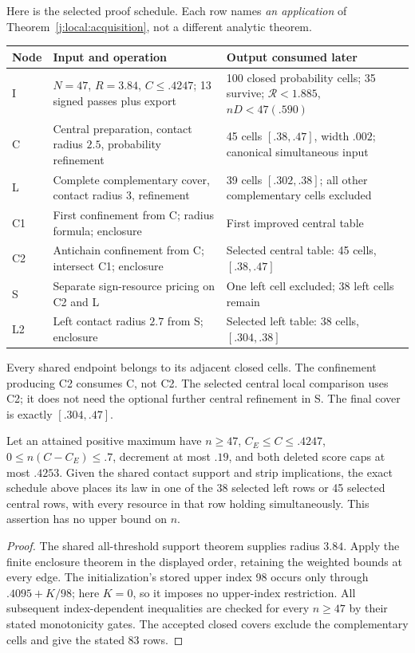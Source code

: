 Here is the selected proof schedule. Each row names \emph{an application}
of Theorem~\ref{j:local:acquisition}, not a different analytic theorem.
\begin{center}\small
\begin{tabular}{p{.13\linewidth}p{.32\linewidth}p{.45\linewidth}}
\toprule
Node&Input and operation&Output consumed later\\\midrule
I&$N=47$, $R=3.84$, $C\le.4247$; 13 signed passes plus export&
100 closed probability cells; 35 survive; $\mathcal R<1.885$, $nD<47(.590)$\\
C&Central preparation, contact radius $2.5$, probability refinement&
45 cells $[.38,.47]$, width $.002$; canonical simultaneous input\\
L&Complete complementary cover, contact radius $3$, refinement&
39 cells $[.302,.38]$; all other complementary cells excluded\\
C1&First confinement from C; radius formula; enclosure&
First improved central table\\
C2&Antichain confinement from C; intersect C1; enclosure&
Selected central table: 45 cells, $[.38,.47]$\\
S&Separate sign-resource pricing on C2 and L&
One left cell excluded; 38 left cells remain\\
L2&Left contact radius $2.7$ from S; enclosure&
Selected left table: 38 cells, $[.304,.38]$\\\bottomrule
\end{tabular}
\end{center}
Every shared endpoint belongs to its adjacent closed cells. The
confinement producing C2 consumes C, not C2. The selected central local
comparison uses C2; it does not need the optional further central
refinement in S. The final cover is exactly $[.304,.47]$.

\begin{corollary}\label{j:local:re:acquired}
Let an attained positive maximum have $n\ge47$, $C_E\le C\le.4247$,
$0\le n(C-C_E)\le.7$, decrement at most $.19$, and both deleted
score caps at most $.4253$.
Given the shared contact support and strip implications, the exact
schedule above places its law in one of the 38 selected left rows or
45 selected central rows, with every resource in that row holding
simultaneously. This assertion has no upper bound on $n$.
\end{corollary}
\begin{proof}
The shared all-threshold support theorem supplies radius $3.84$.
Apply the finite enclosure theorem in the displayed order, retaining
the weighted bounds at every edge. The initialization's stored upper
index 98 occurs only through $.4095+K/98$; here $K=0$, so it imposes
no upper-index restriction. All subsequent index-dependent inequalities
are checked for every $n\ge47$ by their stated monotonicity gates.
The accepted closed covers exclude the complementary cells and give
the stated 83 rows.
\end{proof}

